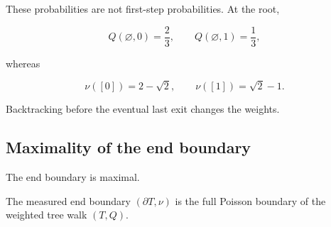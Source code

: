 \documentclass[11pt,a4paper]{scrartcl}
\begin{document}
These probabilities are not first-step probabilities. At the root,

\[
Q(\varnothing,0)=\frac23,
\qquad
Q(\varnothing,1)=\frac13,
\]

whereas

\[
\nu([0])=2-\sqrt2,
\qquad
\nu([1])=\sqrt2-1.
\]

Backtracking before the eventual last exit changes the weights.


\subsection{Maximality of the end boundary}\label{subsec:maximality-of-the-end-boundary}


The end boundary is maximal.

\begin{proposition}\label{prop:end-boundary-maximal}
The measured end boundary \((\partial T,\nu)\) is the full
Poisson boundary of the weighted tree walk \((T,Q)\).

\end{proposition}
\end{document}
